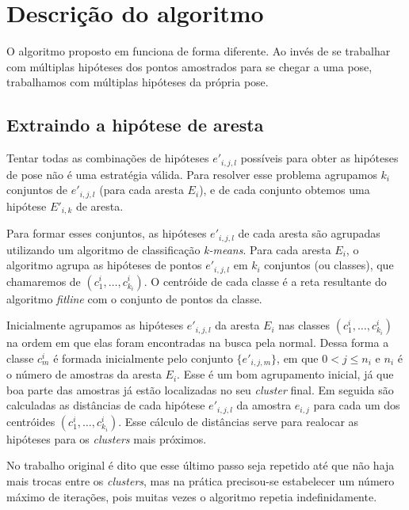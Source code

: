\section{Descrição do algoritmo}

O algoritmo proposto em \cite{celine} funciona de forma diferente. Ao invés de se trabalhar com múltiplas hipóteses dos pontos amostrados para se chegar a uma pose, trabalhamos com múltiplas hipóteses da própria pose.

\subsection{Extraindo a hipótese de aresta}

Tentar todas as combinações de hipóteses $e'_{i,j,l}$ possíveis para obter as hipóteses de pose não é uma estratégia válida. Para resolver esse problema agrupamos $k_i$ conjuntos de $e'_{i,j,l}$ (para cada aresta $E_i$), e de cada conjunto obtemos uma hipótese $E'_{i,k}$ de aresta.

Para formar esses conjuntos, as hipóteses $e'_{i,j,l}$ de cada aresta são agrupadas utilizando um algoritmo de classificação \emph{k-means}. Para cada aresta $E_i$, o algoritmo agrupa as hipóteses de pontos $e'_{i,j,l}$ em $k_i$ conjuntos (ou classes), que chamaremos de $(c^i_1, \dots, c^i_{k_i})$. O centróide de cada classe é a reta resultante do algoritmo \emph{fitline} \cite{fitline_doc} com o conjunto de pontos da classe.

Inicialmente agrupamos as hipóteses $e'_{i,j,l}$ da aresta $E_i$ nas classes $(c^i_1, \dots, c^i_{k_i})$ na ordem em que elas foram encontradas na busca pela normal. Dessa forma a classe $c^i_m$ é formada inicialmente pelo conjunto $\{e'_{i,j,m}\}$, em que $0 < j \leq n_i$ e $n_i$ é o número de amostras da aresta $E_i$. Esse é um bom agrupamento inicial, já que boa parte das amostras já estão localizadas no seu \emph{cluster} final. Em seguida são calculadas as distâncias de cada hipótese $e'_{i,j,l}$ da amostra $e_{i,j}$ para cada um dos centróides $(c^i_1, \dots, c^i_{k_i})$. Esse cálculo de distâncias serve para realocar as hipóteses para os \emph{clusters} mais próximos.

No trabalho original \cite{celine} é dito que esse último passo seja repetido até que não haja mais trocas entre os \emph{clusters}, mas na prática precisou-se estabelecer um número máximo de iterações, pois muitas vezes o algoritmo repetia indefinidamente.


